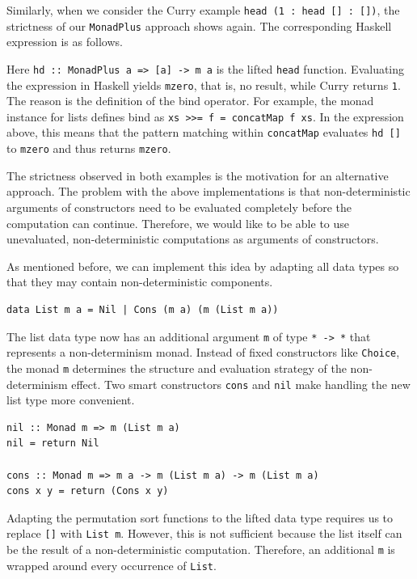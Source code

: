 \documentclass[a4paper, 11pt, fleqn, twoside]{scrreprt}
\newcommand{\hinl}[1]{\texttt{#1}}
\begin{document}
Similarly, when we consider the Curry example \hinl{head (1 : 
head [] : [])}, the strictness of our \hinl{MonadPlus} approach 
shows again. The corresponding Haskell expression is as follows.


Here \hinl{hd :: MonadPlus a => [a] -> m a} is the lifted 
\hinl{head} function. Evaluating the expression in Haskell 
yields \hinl{mzero}, that is, no result, while Curry returns 
\hinl{1}. The reason is the definition of the bind operator. For 
example, the monad instance for lists defines bind as \hinl{xs 
>>= f = concatMap f xs}. In the expression above, this means that the pattern 
matching within \hinl{concatMap} evaluates 
\hinl{hd []} to \hinl{mzero} and thus returns 
\hinl{mzero}.

The strictness observed in both examples is the motivation for an alternative 
approach. The problem with the above implementations is that non-deterministic 
arguments of constructors need to be evaluated completely before the 
computation can continue. Therefore, we would like to be able to use 
unevaluated, non-deterministic computations as arguments of constructors.

As mentioned before, we can implement this idea by adapting all data types so 
that they may contain non-deterministic components.

\begin{verbatim}
data List m a = Nil | Cons (m a) (m (List m a))
\end{verbatim}

The list data type now has an additional argument \hinl{m} of 
type \hinl{* -> *} that represents a non-determinism monad. 
Instead of fixed constructors like \hinl{Choice}, the monad 
\hinl{m} determines the structure and evaluation strategy 
of the non-determinism effect. Two smart constructors 
\hinl{cons} and \hinl{nil} make handling the new 
list type more convenient.

\begin{verbatim}
nil :: Monad m => m (List m a)
nil = return Nil

cons :: Monad m => m a -> m (List m a) -> m (List m a)
cons x y = return (Cons x y)
\end{verbatim}

Adapting the permutation sort functions to the lifted data type requires us to 
replace \hinl{[]} with \hinl{List m}. However, 
this is not sufficient because the list itself can be the result of a 
non-deterministic computation. Therefore, an additional \hinl{m} 
is wrapped around every occurrence of \hinl{List}.
\end{document}
